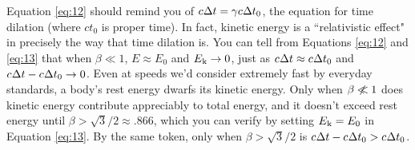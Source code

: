 \documentclass[12pt]{article}
\begin{document}
Equation \ref{eq:12} should remind you of $c \mkern.5mu \Delta t=\gamma c \mkern.5mu \Delta t_0$, the equation for time dilation (where $ct_0$ is proper time). In fact, kinetic energy is a ``relativistic effect" in precisely the way that time dilation is. You can tell from Equations \ref{eq:12} and \ref{eq:13} that when $\beta \ll 1$, $E \approx E_0$ and $E_{\mkern.5mu \textrm{k}} \rightarrow 0$, just as $c \mkern.5mu \Delta t \approx c \mkern.5mu \Delta t_0$ and $c \mkern.5mu \Delta t - c \mkern.5mu \Delta t_0 \rightarrow 0$. Even at speeds we'd consider extremely fast by everyday standards, a body's rest energy dwarfs its kinetic energy. Only when $\beta \centernot{\ll} 1$ does kinetic energy contribute appreciably to total energy, and it doesn't exceed rest energy until $\beta > \sqrt{3}/2 \approx .866$, which you can verify by setting $E_{\mkern.5mu \textrm{k}}=E_0$ in Equation \ref{eq:13}. By the same token, only when $\beta > \sqrt{3}/2$ is $c \mkern.5mu \Delta t - c \mkern.5mu \Delta t_0 > c \mkern.5mu \Delta t_0$.
\end{document}
